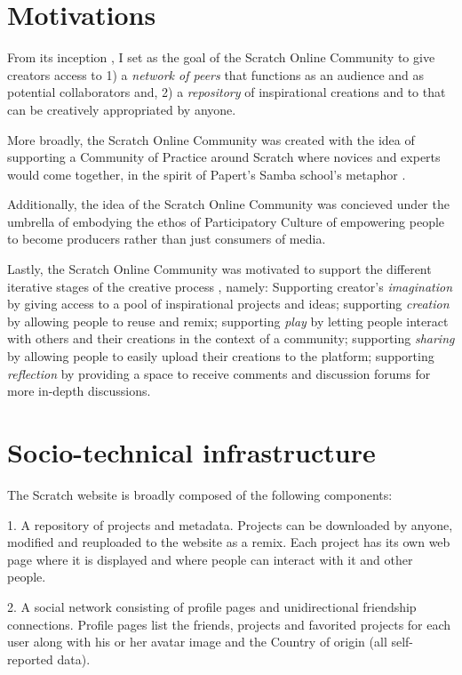 \section{Motivations}

From its inception \citep{monroy-hernandez_scratchr:_2007,monroy-hernandez_empowering_2008}, I set as the goal of the Scratch Online Community to give creators access to 
1) a \emph{network of peers} that functions as an audience and as potential collaborators and,
2) a \emph{repository} of inspirational creations and to that can be creatively appropriated by anyone.

More broadly, the Scratch Online Community was created with the idea of supporting a Community of Practice around Scratch where novices and experts would come together,  in the spirit of Papert's Samba school's metaphor \citep{papert_mindstorms_1980}.

Additionally, the idea of the Scratch Online Community was concieved under the umbrella of embodying the ethos of Participatory Culture of empowering people to become producers rather than just consumers of media.

Lastly, the Scratch Online Community was motivated to support the different iterative stages of the creative process \citep{resnick_sowing_2008}, namely:
Supporting creator's \emph{imagination} by giving access to a pool of inspirational projects and ideas; supporting \emph{creation} by allowing people to reuse and remix; supporting \emph{play} by letting people interact with others and their creations in the context of a community; supporting \emph{sharing} by allowing people to easily upload their creations to the platform; supporting \emph{reflection} by providing a space to receive comments and discussion forums for more in-depth discussions.

\section{Socio-technical infrastructure}
The Scratch website is broadly composed of the following components: 

1. A repository of projects and metadata. Projects can be downloaded by anyone, modified and reuploaded to the website as a remix. Each project has its own web page where it is displayed and where people can interact with it and other people.

2. A social network consisting of profile pages and unidirectional friendship connections. Profile pages list the friends, projects and favorited projects for each user along with his or her avatar image and the Country of origin (all self-reported data).

